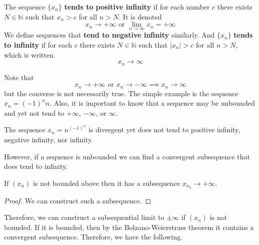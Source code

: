     \begin{definition}
      The sequence $\{x_n\}$ \textbf{tends to positive infinity} if for each number $c$ there exists $N \in \mathbb{N}$ such that $x_n > c$ for all $n > N$. It is denoted 
      \begin{equation}
        x_n \rightarrow + \infty \text{ or } \lim_{n \rightarrow \infty} x_n = + \infty
      \end{equation}
      We define sequences that \textbf{tend to negative infinity} similarly. And $\{x_n\}$ \textbf{tends to infinity} if for each $c$ there exists $N \in \mathbb{N}$ such that $|x_n| > c$ for all $n > N$, which is written 
      \begin{equation}
        x_n \rightarrow \infty
      \end{equation}
    \end{definition}

    Note that 
    \begin{equation}
      x_n \rightarrow +\infty \text{ or } x_n \rightarrow -\infty \implies x_n \rightarrow \infty
    \end{equation}
    but the converse is not necessarily true. The simple example is the sequence $x_n = (-1)^n n$. Also, it is important to know that a sequence may be unbounded and yet not tend to $+\infty$, $-\infty$, or $\infty$. 

    \begin{example}
      The sequence $x_n = n^{(-1)^n}$ is divergent yet does not tend to positive infinity, negative infinity, nor infinity. 
    \end{example} 

    However, if a sequence is unbounded we can find a convergent subsequence that does tend to infinity. 

    \begin{theorem}
      If $(x_n)$ is not bounded above then it has a subsequence $x_{n_k} \rightarrow +\infty$. 
    \end{theorem}
    \begin{proof}
      We can construct such a subsequence. 
    \end{proof}

    Therefore, we can construct a subsequential limit to $\pm \infty$ if $(x_n)$ is not bounded. If it is bounded, then by the Bolzano-Weierstrass theorem it contains a convergent subsequence. Therefore, we have the following. 

